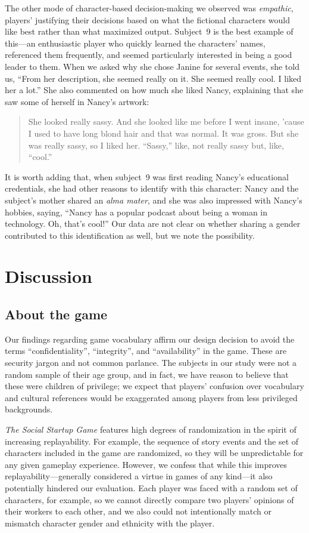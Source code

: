\documentclass[letterpaper]{article}
\begin{document}
The other mode of character-based decision-making we
observed was \textit{empathic},
players' justifying their decisions based on what the
fictional characters would like best rather than what maximized output.
Subject~9 is the best example of this---an enthusiastic player
who quickly learned the characters' names, referenced them frequently,
and seemed particularly interested in being a good leader to them.
When we asked why she chose Janine for several events, she told us, 
``From her description, she seemed really on it. She seemed really cool.
I liked her a lot.'' 
She also commented on how much she liked Nancy, explaining that
she saw some of herself in Nancy's artwork:
\begin{quote}
She looked really sassy. And she looked like me before
I went insane, 'cause I used to have long blond hair and that was
normal. It was gross. But she was really sassy, so I liked her.
``Sassy,'' like, not really sassy but, like, ``cool.''
\end{quote}
It is worth adding that, when subject~9 was first reading Nancy's 
educational credentials, she had other reasons to identify with
this character: Nancy and the subject's mother shared an \textit{alma mater},
and she was also impressed with Nancy's hobbies, saying, ``Nancy has a popular podcast about being a woman in technology. Oh, that's cool!'' 
Our data are not clear on whether sharing a gender contributed to this
identification as well, but we note the possibility.


\section{Discussion}
\label{sec:discussion}

\subsection{About the game}

Our findings regarding game vocabulary affirm our design decision
to avoid the terms ``confidentiality'', ``integrity'', and ``availability''
in the game. These are security jargon and not common parlance.
The subjects in our study were not a random sample of their age group,
and in fact, we have reason to believe that these were children of
privilege; we expect that players' confusion over vocabulary
and cultural references would be exaggerated among players from
less privileged backgrounds.

\textit{The Social Startup Game} features high degrees of randomization
in the spirit of increasing replayability. For example, the sequence
of story events and the set of characters included in the game are randomized,
so they will be unpredictable for any given gameplay experience.
However, we confess that while this improves replayability---generally
considered a virtue in games of any kind---it also potentially hindered
our evaluation. Each player was faced with a random set of characters,
for example, so we cannot directly compare two players' opinions of their
workers to each other, and we also could not intentionally match
or mismatch character gender and ethnicity with the player.
\end{document}
